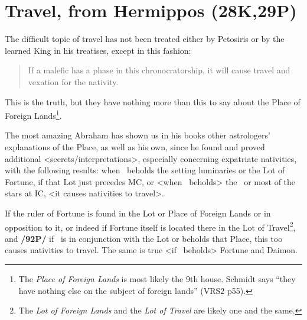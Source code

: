 \section{Travel, from Hermippos (28K,29P)}

The difficult topic of travel has not been treated either by Petosiris or by the learned King in his treatises, except in this fashion: \begin{quote}If a malefic has a phase in this chronocratorship, it will cause travel and vexation for the nativity.\end{quote} This is the truth, but they have nothing more than this to say about the Place of Foreign Lands\footnote{The \textsl{Place of Foreign Lands} is most likely the 9th house. Schmidt says ``they have nothing else on the subject of foreign lands'' (VRS2 p55).}. 

The most amazing Abraham has shown us in his books other astrologers’ explanations of the Place, as well as his own, since he found and proved additional <secrets/interpretations>, especially concerning expatriate nativities, with the following results: when \Mars\, beholds the setting luminaries or the Lot of Fortune, if that Lot just precedes MC, or <when \Mars\, beholds> the \Moon\, or most of the stars at IC, <it causes nativities to travel>. 

If the ruler of Fortune is found in the Lot or Place of Foreign Lands or in opposition to it, or indeed if Fortune itself is located there in the Lot of Travel\footnote{The \textsl{Lot of Foreign Lands} and the \textsl{Lot of Travel} are likely one and the same.}, and \textbf{/92P/} if \Mars\, is in conjunction with the Lot or beholds that Place, this too causes nativities to travel. The same is true <if \Mars\, beholds> Fortune and Daimon.


\newpage